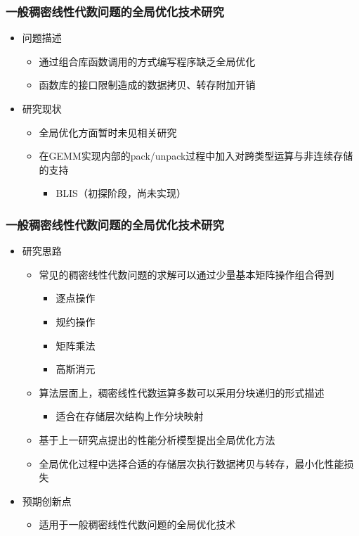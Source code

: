 \documentclass[aspectratio=169]{beamer}
\begin{document}
\begin{frame}
  \frametitle{一般稠密线性代数问题的全局优化技术研究}
  \begin{itemize}
  \item 问题描述
    \begin{itemize}
    \item 通过组合库函数调用的方式编写程序缺乏全局优化
    \item 函数库的接口限制造成的数据拷贝、转存附加开销
    \end{itemize}
  \item 研究现状
    \begin{itemize}
    \item 全局优化方面暂时未见相关研究
    \item 在GEMM实现内部的pack/unpack过程中加入对跨类型运算与非连续存储的支持
      \begin{itemize}
      \item BLIS（初探阶段，尚未实现）
      \end{itemize}
    \end{itemize}
  \end{itemize}
\end{frame}

\begin{frame}
  \frametitle{一般稠密线性代数问题的全局优化技术研究}
  \begin{itemize}
  \item 研究思路
    \begin{itemize}
    \item 常见的稠密线性代数问题的求解可以通过少量基本矩阵操作组合得到
      \begin{itemize}
      \item 逐点操作
      \item 规约操作
      \item 矩阵乘法
      \item 高斯消元
      \end{itemize}
    \item 算法层面上，稠密线性代数运算多数可以采用分块递归的形式描述
      \begin{itemize}
      \item 适合在存储层次结构上作分块映射
      \end{itemize}
    \item 基于上一研究点提出的性能分析模型提出全局优化方法
    \item 全局优化过程中选择合适的存储层次执行数据拷贝与转存，最小化性能损失
    \end{itemize}
  \item 预期创新点
    \begin{itemize}
    \item 适用于一般稠密线性代数问题的全局优化技术
    \end{itemize}
  \end{itemize}
\end{frame}
\end{document}
